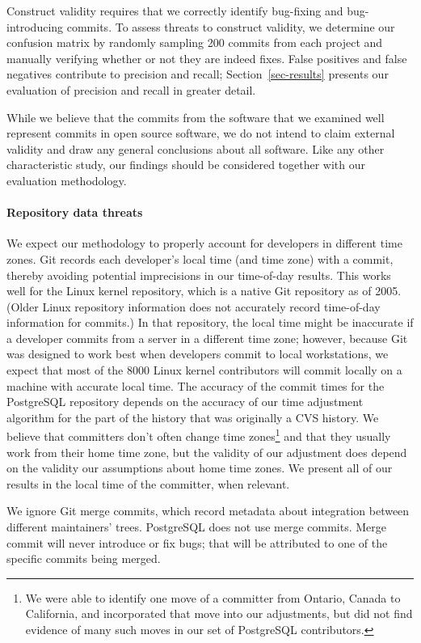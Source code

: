 Construct validity requires that we correctly identify bug-fixing and
bug-introducing commits. To assess threats to construct validity, we determine
our confusion matrix by randomly sampling 200 commits from each project and
manually verifying whether or not they are indeed fixes. False positives and
false negatives contribute to precision and recall; Section~\ref{sec-results}
presents our evaluation of precision and recall in greater detail.

While we believe that the commits from the software that we examined well
represent commits in open source software, we do not intend to claim external
validity and draw any general conclusions about all software. Like any other
characteristic study, our findings should be considered together with our
evaluation methodology.

\paragraph{Repository data threats}

We expect our methodology to properly account for developers in different time
zones. Git records each developer's local time (and time zone) with a commit,
thereby avoiding potential imprecisions in our time-of-day results. This works
well for the Linux kernel repository, which is a native Git repository as of
2005. (Older Linux repository information does not accurately record time-of-day
information for commits.) In that repository, the local time might be inaccurate
if a developer commits from a server in a different time zone; however, because
Git was designed to work best when developers commit to local workstations, we
expect that most of the 8000 Linux kernel contributors will commit locally on a
machine with accurate local time. The accuracy of the commit times for the
PostgreSQL repository depends on the accuracy of our time adjustment algorithm
for the part of the history that was originally a CVS history. We believe that
committers don't often change time zones\footnote{We were able to identify one
 move of a committer from Ontario, Canada to California, and incorporated that move
 into our adjustments, but did not find evidence of many such moves in our set
 of PostgreSQL contributors.} and that they usually work from their home time
zone, but the validity of our adjustment does depend on the validity our
assumptions about home time zones. We present all of our results in the local
time of the committer, when relevant.

We ignore Git merge commits, which record metadata about integration between
different maintainers' trees. PostgreSQL does not use merge commits. Merge
commit will never introduce or fix bugs; that will be attributed to one of the
specific commits being merged.

